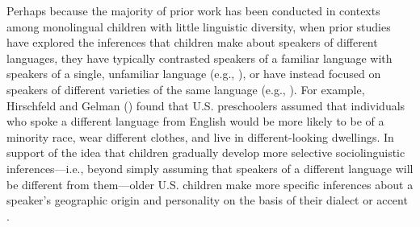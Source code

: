 \documentclass{foushee-adapted-preprint}
\begin{document}
Perhaps because the majority of prior work has been conducted in contexts among monolingual children with little linguistic diversity, when prior studies have explored the inferences that children make about speakers of different languages, they have typically contrasted speakers of a familiar language with speakers of a single, unfamiliar language (e.g., \cite{liberman2017preverbal, hirschfeld1997young, kinzler2012children, kinzler2007native, moon1993two, wagner2014children}), or have instead focused on speakers of different varieties of the same language (e.g., \cite{weatherhead2019preschoolers, mccullough2019regional, kinzler2013northern}). 
For example, Hirschfeld and Gelman (\citeyear{hirschfeld1997young}) found that U.S. preschoolers assumed that individuals who spoke a different language from English would be more likely to be  of a minority race, wear different clothes, and live in different-looking dwellings. In support of the idea that children gradually develop more selective sociolinguistic inferences---i.e., beyond simply assuming that speakers of a different language will be different from them---older U.S. children make more specific inferences about a speaker's geographic origin and personality on the basis of their dialect or accent \parencite{mccullough2019regional,kinzler2013northern}.
\end{document}
